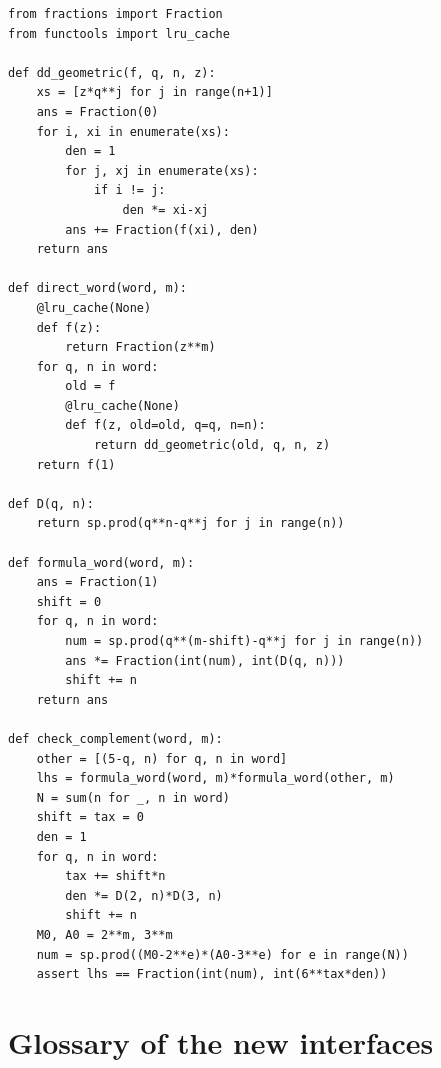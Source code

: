 \documentclass[11pt,oneside]{article}
\theoremstyle{definition}
\theoremstyle{remark}
\begin{document}
\begin{lstlisting}[style=pythonstyle]
from fractions import Fraction
from functools import lru_cache

def dd_geometric(f, q, n, z):
    xs = [z*q**j for j in range(n+1)]
    ans = Fraction(0)
    for i, xi in enumerate(xs):
        den = 1
        for j, xj in enumerate(xs):
            if i != j:
                den *= xi-xj
        ans += Fraction(f(xi), den)
    return ans

def direct_word(word, m):
    @lru_cache(None)
    def f(z):
        return Fraction(z**m)
    for q, n in word:
        old = f
        @lru_cache(None)
        def f(z, old=old, q=q, n=n):
            return dd_geometric(old, q, n, z)
    return f(1)

def D(q, n):
    return sp.prod(q**n-q**j for j in range(n))

def formula_word(word, m):
    ans = Fraction(1)
    shift = 0
    for q, n in word:
        num = sp.prod(q**(m-shift)-q**j for j in range(n))
        ans *= Fraction(int(num), int(D(q, n)))
        shift += n
    return ans

def check_complement(word, m):
    other = [(5-q, n) for q, n in word]
    lhs = formula_word(word, m)*formula_word(other, m)
    N = sum(n for _, n in word)
    shift = tax = 0
    den = 1
    for q, n in word:
        tax += shift*n
        den *= D(2, n)*D(3, n)
        shift += n
    M0, A0 = 2**m, 3**m
    num = sp.prod((M0-2**e)*(A0-3**e) for e in range(N))
    assert lhs == Fraction(int(num), int(6**tax*den))
\end{lstlisting}

\section{Glossary of the new interfaces}
\label{app:glossary}
\end{document}
